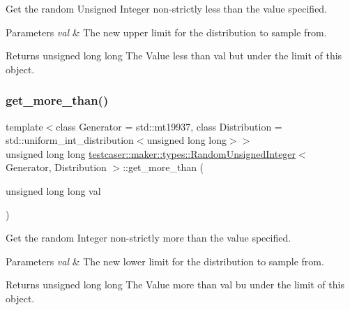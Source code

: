 Get the random Unsigned Integer non-\/strictly less than the value specified. 


\begin{DoxyParams}{Parameters}
{\em val} & The new upper limit for the distribution to sample from. \\
\hline
\end{DoxyParams}
\begin{DoxyReturn}{Returns}
unsigned long long The Value less than val but under the limit of this object. 
\end{DoxyReturn}
\mbox{\label{classtestcaser_1_1maker_1_1types_1_1RandomUnsignedInteger_a04d02042b14bec27cbff6bbd4aeb1186}} 
\subsubsection{\texorpdfstring{get\+\_\+more\+\_\+than()}{get\_more\_than()}}
{\footnotesize\ttfamily template$<$class Generator = std\+::mt19937, class Distribution = std\+::uniform\+\_\+int\+\_\+distribution$<$unsigned long long$>$$>$ \\
unsigned long long \hyperlink{classtestcaser_1_1maker_1_1types_1_1RandomUnsignedInteger}{testcaser\+::maker\+::types\+::\+Random\+Unsigned\+Integer}$<$ Generator, Distribution $>$\+::get\+\_\+more\+\_\+than (\begin{DoxyParamCaption}\item[{unsigned long long}]{val }\end{DoxyParamCaption})\hspace{0.3cm}{\ttfamily [inline]}}



Get the random Integer non-\/strictly more than the value specified. 


\begin{DoxyParams}{Parameters}
{\em val} & The new lower limit for the distribution to sample from. \\
\hline
\end{DoxyParams}
\begin{DoxyReturn}{Returns}
unsigned long long The Value more than val bu under the limit of this object. 
\end{DoxyReturn}
\mbox{\label{classtestcaser_1_1maker_1_1types_1_1RandomUnsignedInteger_ac0ec747e5fe2701bd3533866e97ffcf7}} 

